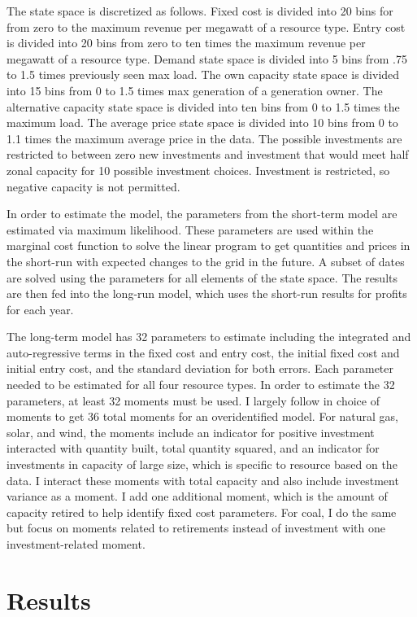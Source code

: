 \documentclass[12pt]{article}
\begin{document}
The state space is discretized as follows. Fixed cost is divided into 20 bins for from zero to the maximum revenue per megawatt of a resource type. Entry cost is divided into 20 bins from zero to ten times the maximum revenue per megawatt of a resource type. Demand state space is divided into 5 bins from .75 to 1.5 times previously seen max load. The own capacity state space is divided into 15 bins from 0 to 1.5 times max generation of a generation owner. The alternative capacity state space is divided into ten bins from 0 to 1.5 times the maximum load. The average price state space is divided into 10 bins from 0 to 1.1 times the maximum average price in the data. 
The possible investments are restricted to between zero new investments and investment that would meet half zonal capacity for 10 possible investment choices. Investment is restricted, so negative capacity is not permitted.

In order to estimate the model, the parameters from the short-term model are estimated via maximum likelihood. These parameters are used within the marginal cost function to solve the linear program to get quantities and prices in the short-run with expected changes to the grid in the future. A subset of dates are solved using the parameters for all elements of the state space. The results are then fed into the long-run model, which uses the short-run results for profits for each year.

The long-term model has 32 parameters to estimate including the integrated and auto-regressive terms in the fixed cost and entry cost, the initial fixed cost and initial entry cost, and the standard deviation for both errors. Each parameter needed to be estimated for all four resource types. In order to estimate the 32 parameters, at least 32 moments must be used. I largely follow \cite{gowrisankaran2024energy} in choice of moments to get 36 total moments for an overidentified model. For natural gas, solar, and wind, the moments include an indicator for positive investment interacted with quantity built, total quantity squared, and an indicator for investments in capacity of large size, which is specific to resource based on the data. I interact these moments with total capacity and also include investment variance as a moment. I add one additional moment, which is the amount of capacity retired to help identify fixed cost parameters. For coal, I do the same but focus on moments related to retirements instead of investment with one investment-related moment.


\section{Results} \label{sec:result}
\end{document}
